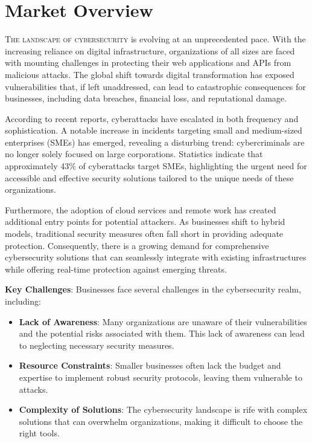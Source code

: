 \chapter{Market Overview}

\lettrine{T}{he landscape of cybersecurity} is evolving at an unprecedented pace. With the increasing reliance on digital infrastructure, organizations of all sizes are faced with mounting challenges in protecting their web applications and APIs from malicious attacks. The global shift towards digital transformation has exposed vulnerabilities that, if left unaddressed, can lead to catastrophic consequences for businesses, including data breaches, financial loss, and reputational damage.

According to recent reports, cyberattacks have escalated in both frequency and sophistication. A notable increase in incidents targeting small and medium-sized enterprises (SMEs) has emerged, revealing a disturbing trend: cybercriminals are no longer solely focused on large corporations. Statistics indicate that approximately 43\% of cyberattacks target SMEs, highlighting the urgent need for accessible and effective security solutions tailored to the unique needs of these organizations.

Furthermore, the adoption of cloud services and remote work has created additional entry points for potential attackers. As businesses shift to hybrid models, traditional security measures often fall short in providing adequate protection. Consequently, there is a growing demand for comprehensive cybersecurity solutions that can seamlessly integrate with existing infrastructures while offering real-time protection against emerging threats.

\textbf{Key Challenges}:  
Businesses face several challenges in the cybersecurity realm, including:
\begin{itemize}
    \item \textbf{Lack of Awareness}: Many organizations are unaware of their vulnerabilities and the potential risks associated with them. This lack of awareness can lead to neglecting necessary security measures.
    \item \textbf{Resource Constraints}: Smaller businesses often lack the budget and expertise to implement robust security protocols, leaving them vulnerable to attacks.
    \item \textbf{Complexity of Solutions}: The cybersecurity landscape is rife with complex solutions that can overwhelm organizations, making it difficult to choose the right tools.
\end{itemize}

